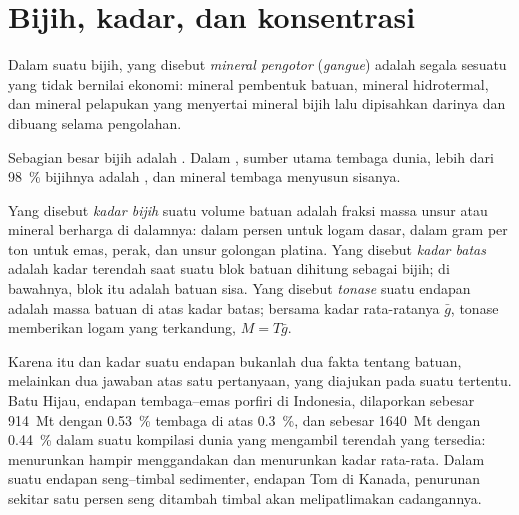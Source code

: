 \section{Bijih, kadar, dan konsentrasi}\label{sec:b2:ore-deposits:grade}

\begin{definition}\label{def:b2:ore-deposits:ore}
Dalam suatu bijih, yang disebut \emph{mineral pengotor} (\textit{gangue}) adalah segala sesuatu yang tidak bernilai ekonomi:
mineral pembentuk batuan, mineral hidrotermal, dan mineral pelapukan yang menyertai mineral bijih lalu
dipisahkan darinya dan dibuang selama pengolahan.
\end{definition}

Sebagian besar bijih adalah . Dalam , sumber utama tembaga dunia, lebih dari
\qty{98}{\percent} bijihnya adalah , dan mineral tembaga menyusun sisanya.

\begin{definition}\label{def:b2:ore-deposits:grade}
Yang disebut \emph{kadar bijih} suatu volume batuan adalah fraksi massa unsur atau mineral
berharga di dalamnya: dalam persen untuk logam dasar, dalam gram per ton untuk emas, perak, dan
unsur golongan platina. Yang disebut \emph{kadar batas} adalah kadar terendah
saat suatu blok batuan dihitung sebagai bijih; di bawahnya, blok itu adalah batuan sisa. Yang disebut
\emph{tonase} suatu endapan adalah massa batuan di atas kadar batas; bersama kadar
rata-ratanya $\bar g$, tonase memberikan logam yang terkandung, $M = T\bar g$.
\end{definition}

Karena itu  dan kadar suatu endapan bukanlah dua fakta tentang batuan, melainkan dua
jawaban atas satu pertanyaan, yang diajukan pada suatu  tertentu. Batu Hijau, endapan tembaga--emas porfiri di
Indonesia, dilaporkan sebesar \qty{914}{Mt} dengan \qty{0.53}{\percent} tembaga di atas 
\qty{0.3}{\percent}, dan sebesar \qty{1640}{Mt} dengan \qty{0.44}{\percent} dalam suatu kompilasi dunia
yang mengambil  terendah yang tersedia: menurunkan  hampir menggandakan  dan
menurunkan kadar rata-rata. Dalam suatu endapan seng--timbal sedimenter, endapan Tom di Kanada, penurunan
 sekitar satu persen seng ditambah timbal akan melipatlimakan cadangannya.


